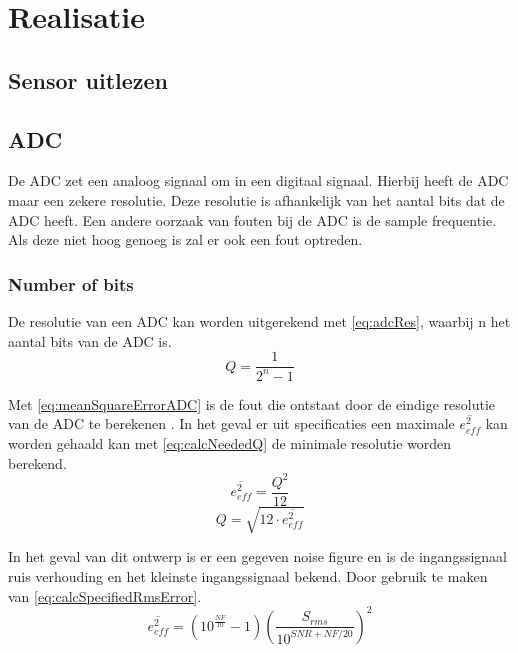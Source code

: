 \section{Realisatie}

\subsection{Sensor uitlezen}

\subsection{ADC}

De ADC zet een analoog signaal om in een digitaal signaal. Hierbij heeft de ADC maar een zekere resolutie. Deze resolutie is afhankelijk van het aantal bits dat de ADC heeft. Een andere oorzaak van fouten bij de ADC is de sample frequentie. Als deze niet hoog genoeg is zal er ook een fout optreden.

\subsubsection{Number of bits} \label{sec:ADC:numBits}
De resolutie van een ADC kan worden uitgerekend met \autoref{eq:adcRes}, waarbij n het aantal bits van de ADC is.
\begin{equation}\label{eq:adcRes}
    Q=\frac{1}{2^n-1}
\end{equation}

Met \autoref{eq:meanSquareErrorADC} is de fout die ontstaat door de eindige resolutie van de ADC te berekenen \cite{MJHcalcADC}. In het geval er uit specificaties een maximale $\overline{e_{eff}^2}$ kan worden gehaald kan met \autoref{eq:calcNeededQ} de minimale resolutie worden berekend.
\begin{equation}\label{eq:meanSquareErrorADC} 
    \overline{e_{eff}^2}=\frac{Q^2}{12}
\end{equation}
\begin{equation}\label{eq:calcNeededQ}
    Q=\sqrt{12\cdot\overline{e_{eff}^2}}
\end{equation}

In het geval van dit ontwerp is er een gegeven noise figure en is de ingangssignaal ruis verhouding en het kleinste ingangssignaal bekend. Door gebruik te maken van \autoref{eq:calcSpecifiedRmsError}.
\begin{equation}\label{eq:calcSpecifiedRmsError}
    \overline{e_{eff}^2}=\left(10^{\frac{NF}{10}}-1\right)\left(\frac{S_{rms}}{10^{SNR+NF/20}}\right)^2
\end{equation}

